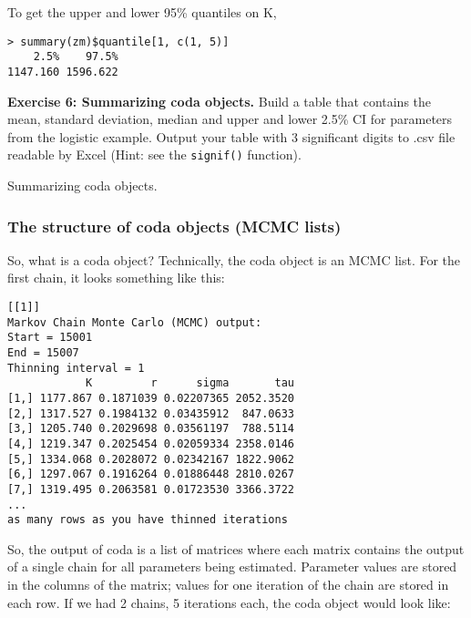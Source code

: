 \documentclass[12pt,english]{article}
\begin{document}
{\noindent To get the upper and lower 95\% quantiles on K, 

\begin{Verbatim}
> summary(zm)$quantile[1, c(1, 5)]
    2.5%    97.5%
1147.160 1596.622
\end{Verbatim}

\bigskip
\belowcaptionskip=-40pt
\begin{exercise}
\begin{mdframed}
\doublespacing
\textbf{Exercise 6: Summarizing coda objects.} Build a table that contains the mean, standard deviation, median and upper and lower 2.5\% CI for parameters from the logistic example. Output your table with 3 significant digits to .csv file readable by Excel (Hint: see the \texttt{signif()} function).
\end{mdframed}
\captionsetup{textformat=empty, labelformat=empty}
\caption[Manipulating coda summaries]{Summarizing coda objects.}
\label{ex:coda manipulation}
\end{exercise}
\belowcaptionskip=0pt

\subsubsection{The structure of coda objects (MCMC lists)}

So, what is a coda object? Technically, the coda object is an MCMC list. For the first chain, it looks something like this:

\begin{Verbatim}[fontsize=\small]
[[1]]
Markov Chain Monte Carlo (MCMC) output:
Start = 15001
End = 15007
Thinning interval = 1
            K         r      sigma       tau
[1,] 1177.867 0.1871039 0.02207365 2052.3520
[2,] 1317.527 0.1984132 0.03435912  847.0633
[3,] 1205.740 0.2029698 0.03561197  788.5114
[4,] 1219.347 0.2025454 0.02059334 2358.0146
[5,] 1334.068 0.2028072 0.02342167 1822.9062
[6,] 1297.067 0.1916264 0.01886448 2810.0267
[7,] 1319.495 0.2063581 0.01723530 3366.3722
...
as many rows as you have thinned iterations
\end{Verbatim}

\noindent So, the output of coda is a list of matrices where each matrix contains the output of a single chain for all parameters being estimated. Parameter values are stored in the columns of the matrix; values for one iteration of the chain are stored in each row. If we had 2 chains, 5 iterations each, the coda object would look like:

}
\end{document}
